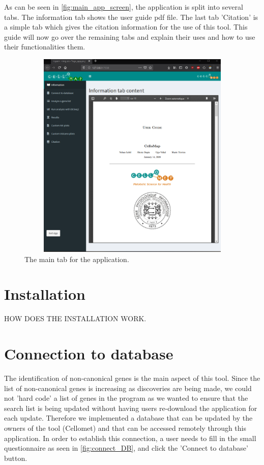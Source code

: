 \documentclass[11pt]{article}
\begin{document}
As can be seen in \autoref{fig:main_app_screen}, the application is split into several tabs. The information tab shows the user guide pdf file. The last tab 'Citation' is a simple tab which gives the citation information for the use of this tool. This guide will now go over the remaining tabs and explain their uses and how to use their functionalities them.
\begin{figure}[h!]
\centering
\includegraphics[width=15cm,height=10cm,keepaspectratio]{main_app_screen.png}
\caption{The main tab for the application.}
\label{fig:main_app_screen}
\end{figure}

\section{Installation}
HOW DOES THE INSTALLATION WORK.

\section{Connection to database}
The identification of non-canonical genes is the main aspect of this tool. Since the list of non-canonical genes is increasing as discoveries are being made, we could not 'hard code' a list of genes in the program as we wanted to ensure that the search list is being updated without having users re-download the application for each update. Therefore we implemented a database that can be updated by the owners of the tool (Cellomet) and that can be accessed remotely through this application.
In order to establish this connection, a user needs to fill in the small questionnaire as seen in \autoref{fig:connect_DB}, and click the 'Connect to database' button.
\end{document}

